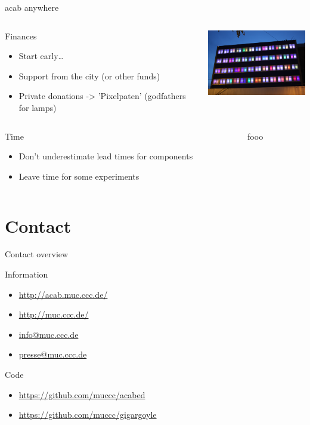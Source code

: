 \documentclass{beamer}
\begin{document}
\begin{frame}{acab anywhere}
  \begin{columns}
    \begin{column}{5cm}
      Finances
      \begin{itemize}
      \item Start early\ldots
      \item Support from the city (or other funds)
      \item Private donations -> 'Pixelpaten' (godfathers for lamps)
      \end{itemize}
    \end{column}
    \begin{column}{5cm}
      \includegraphics[width=5cm]{bilder/pixelpaten.JPG}
    \end{column}
  \end{columns}
\hskip 0.7cm 
  \begin{columns}
    \begin{column}{5cm}
    Time
      \begin{itemize}
      \item Don't underestimate lead times for components 
      \item Leave time for some experiments
      \end{itemize}
    \end{column}
    \begin{column}{5cm}
    fooo
    \end{column}
  \end{columns}
\end{frame}

\section{Contact}
\begin{frame}{Contact overview}
  \begin{block}{Information}
    \begin{itemize}
      \item \url{http://acab.muc.ccc.de/}
      \item \url{http://muc.ccc.de/}
      \item \url{info@muc.ccc.de}
      \item \url{presse@muc.ccc.de}
    \end{itemize}
  \end{block}
  \begin{block}{Code}
    \begin{itemize}
      \item \url{https://github.com/muccc/acabed}
      \item \url{https://github.com/muccc/gigargoyle}
    \end{itemize}
  \end{block}
\end{frame}
\end{document}

